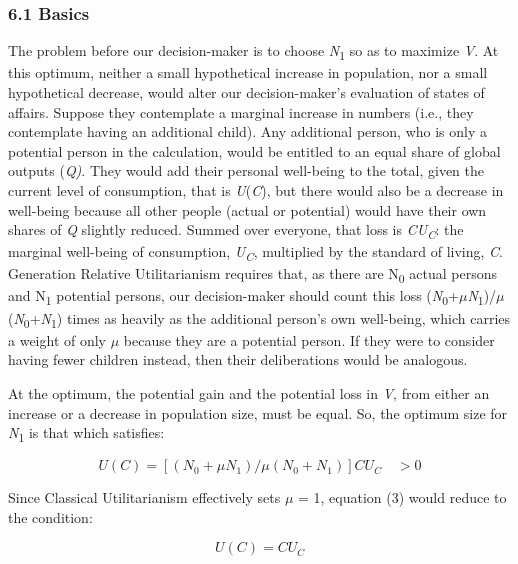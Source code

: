 \documentclass[man,11pt,a4paper,floatsintext]{apa7}
\begin{document}
\subsubsection{6.1 Basics}

The problem before our decision-maker is to choose \textit{N}\textsubscript{1} so as to maximize \textit{V}. At this optimum, neither a small hypothetical increase in population, nor a small hypothetical decrease, would alter our decision-maker's evaluation of states of affairs. Suppose they contemplate a marginal increase in numbers (i.e., they contemplate having an additional child). Any additional person, who is only a potential person in the calculation, would be entitled to an equal share of global outputs (\textit{Q)}. They would add their personal well-being to the total, given the current level of consumption, that is \textit{U}(\textit{C}), but there would also be a decrease in well-being because all other people (actual or potential) would have their own shares of \textit{Q }slightly reduced. Summed over everyone, that loss is \textit{CU}\textsubscript{\textit{C}}: the marginal well-being of consumption, \textit{U}\textsubscript{\textit{C}}, multiplied by the standard of living, \textit{C}. Generation Relative Utilitarianism requires that, as there are N\textsubscript{0} actual persons and N\textsubscript{1} potential persons, our decision-maker should count this loss (\textit{N}\textsubscript{0}+$\mu$\textit{N}\textsubscript{1})/$\mu$(\textit{N}\textsubscript{0}+\textit{N}\textsubscript{1}) times as heavily as the additional person's own well-being, which carries a weight of only $\mu$ because they are a potential person. If they were to consider having fewer children instead, then their deliberations would be analogous.

At the optimum, the potential gain and the potential loss in \textit{V}, from either an increase or a decrease in population size, must be equal. So, the optimum size for \textit{N}\textsubscript{1} is that which satisfies:

\begin{equation}
U(C) = [(N_0+\mu N_1)/\mu(N_0+N_1)]CU_C \quad > 0
\tag{3}
\end{equation}

Since Classical Utilitarianism effectively sets $\mu$ = 1, equation (3) would reduce to the condition:

\begin{equation}
U(C) = CU_C
\tag{4}
\end{equation}
\end{document}
